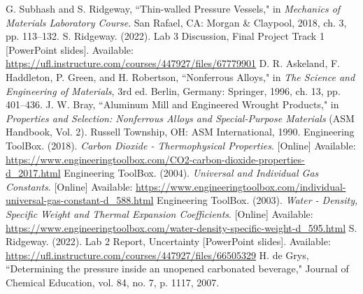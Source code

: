 \documentclass[10pt,journal,letterpaper]{IEEEtran}
\begin{document}
\begin{thebibliography}{00}
 G. Subhash and S. Ridgeway, ``Thin-walled Pressure Vessels," in \textit{Mechanics of Materials Laboratory Course}. San Rafael, CA: Morgan \& Claypool, 2018, ch. 3, pp. 113--132.
 S. Ridgeway. (2022). Lab 3 Discussion, Final Project Track 1 [PowerPoint slides]. Available: \url{https://ufl.instructure.com/courses/447927/files/67779901}
 D. R. Askeland, F. Haddleton, P. Green, and H. Robertson, ``Nonferrous Alloys," in \textit{The Science and Engineering of Materials}, 3rd ed. Berlin, Germany: Springer, 1996, ch. 13, pp. 401--436.
 J. W. Bray, ``Aluminum Mill and Engineered Wrought Products," in \textit{Properties and Selection: Nonferrous Alloys and Special-Purpose Materials} (ASM Handbook, Vol. 2). Russell Township, OH: ASM International, 1990.
 Engineering ToolBox. (2018). \textit{Carbon Dioxide - Thermophysical Properties}. [Online] Available: \url{https://www.engineeringtoolbox.com/CO2-carbon-dioxide-properties-d_2017.html}
 Engineering ToolBox. (2004). \textit{Universal and Individual Gas Constants}. [Online] Available: \url{https://www.engineeringtoolbox.com/individual-universal-gas-constant-d_588.html}
 Engineering ToolBox. (2003). \textit{Water - Density, Specific Weight and Thermal Expansion Coefficients}. [Online] Available: \url{https://www.engineeringtoolbox.com/water-density-specific-weight-d_595.html}
 S. Ridgeway. (2022). Lab 2 Report, Uncertainty [PowerPoint slides]. Available: \url{https://ufl.instructure.com/courses/447927/files/66505329}
 H. de Grys, ``Determining the pressure inside an unopened carbonated beverage," Journal of Chemical Education, vol. 84, no. 7, p. 1117, 2007.
\end{thebibliography}
\end{document}
